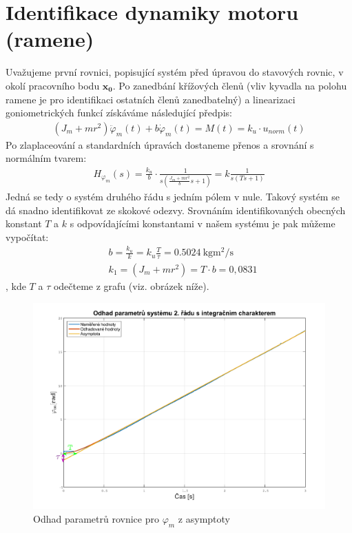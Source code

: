 \documentclass[11pt,a4paper]{article}
\begin{document}
\section{Identifikace dynamiky motoru (ramene)}
Uvažujeme první rovnici, popisující systém před úpravou do stavových rovnic, v okolí pracovního bodu $\mathbf{x_0}$. Po zanedbání křížových členů (vliv kyvadla na polohu ramene je pro identifikaci ostatních členů zanedbatelný) a linearizaci goniometrických funkcí získáváme následující předpis:
\begin{align*}
(J_m + mr^2)\ddot{\varphi}_m(t) + b\dot{\varphi}_m(t) = M(t) = k_u\cdot u_{norm}(t)
\end{align*}
Po zlaplaceování a standardních úpravách dostaneme přenos a srovnání s normálním tvarem:
\begin{align*}
H_{\varphi_m}(s) = \frac{k_u}{b}\cdot \frac{1}{s(\frac{J_m + mr^2}{b}s + 1)} = k\frac{1}{s(Ts + 1)}
\end{align*}
Jedná se tedy o systém druhého řádu s jedním pólem v nule. Takový systém se dá snadno identifikovat ze skokové odezvy. Srovnáním identifikovaných obecných konstant $T$ a $k$ s odpovídajícími konstantami v našem systému je pak můžeme vypočítat:
\begin{align*}
&b = \frac{k_u}{k} = k_u\frac{T}{\tau} = \SI{0,5024}{\kilo \gram \meter \squared \per \second}	\\
&k_1 = (J_m + mr^2) = T\cdot b = 0,0831
\end{align*}
, kde $T$ a $\tau$ odečteme z grafu (viz. obrázek níže).
\begin{figure}[H]
	\centering
    \includegraphics[scale=.4]{Odhad_phim}
    \caption{Odhad parametrů rovnice pro $\varphi_m$ z asymptoty}
\end{figure}
\end{document}
